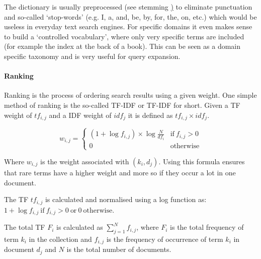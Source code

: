 

The dictionary is usually preprocessed (see stemming \hyperlink{stemming}) to eliminate punctuation and so-called `stop-words' (e.g. I, a, and, be, by, for, the, on, etc.) which would be useless in everyday text search engines. For specific domains it even makes sense to build a `controlled vocabulary', where only very specific terms are included (for example the index at the back of a book). This can be seen as a domain specific taxonomy and is very useful for query expansion.

\paragraph{Ranking}
Ranking is the process of ordering search results using a given weight. One simple method of ranking is the so-called \acl{TF}-\acl{IDF} or \acs{TF}-\acs{IDF} for short. Given a \ac{TF} weight of $tf_{i,j}$ and a \ac{IDF} weight of $idf_j$ it is defined as $tf_{i,j}\times idf_j$.

\begin{equation}
  w_{i,j} =
  \begin{cases}
  (1+\log f_{i,j})\times \log\frac{N}{df_i} & \text{if} \ f_{i,j} > 0 \\
  0 & \text{otherwise}
  \end{cases}
  \label{eq:wij}
\end{equation}

Where $w_{i,j}$ is the weight associated with $(k_i,d_j)$. Using this formula ensures that rare terms have a higher weight and more so if they occur a lot in one document.

The \ac{TF} $tf_{i,j}$ is calculated and normalised using a log function as:
$1+\log f_{i,j} \ \text{if} \ f_{i,j} > 0 \ \text{or} \ 0 \ \text{otherwise}$.

The total \ac{TF} $F_i$ is calculated as $\sum_{j=1}^{N}f_{i,j}$, where $F_i$ is the total frequency of term $k_i$ in the collection and $f_{i,j}$ is the frequency of occurrence of term $k_i$ in document $d_j$ and $N$ is the total number of documents.

